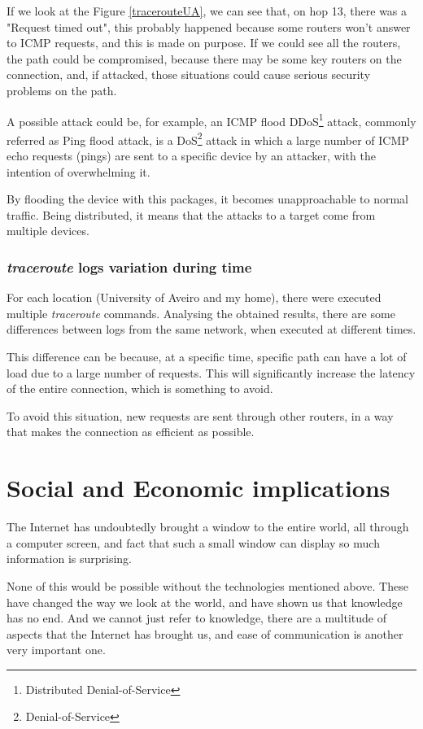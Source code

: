 \documentclass{article}
\newcommand\tab[1][1cm]{\hspace*{#1}}
\begin{document}
\tab If we look at the Figure \underline{\ref{tracerouteUA}}, we can see that, on hop 13, there was a "Request timed out", this probably happened because some routers won't answer to ICMP requests, and this is made on purpose. If we could see all the routers, the path could be compromised, because there may be some key routers on the connection, and, if attacked, those situations could cause serious security problems on the path.

A possible attack could be, for example, an ICMP flood DDoS\footnote{Distributed Denial-of-Service} attack, commonly referred as Ping flood attack, is a DoS\footnote{Denial-of-Service} attack in which a large number of ICMP echo requests (pings) are sent to a specific device by an attacker, with the intention of overwhelming it. 

By flooding the device with this packages, it becomes unapproachable to normal traffic. Being distributed, it means that the attacks to a target come from multiple devices.

\subsubsection{\textit{traceroute} logs variation during time}

\tab For each location (University of Aveiro and my home), there were executed multiple \textit{traceroute} commands. Analysing the obtained results, there are some differences between logs from the same network, when executed at different times. 

This difference can be because, at a specific time, specific path can have a lot of load due to a large number of requests. This will significantly increase the latency of the entire connection, which is something to avoid.

To avoid this situation, new requests are sent through other routers, in a way that makes the connection as efficient as possible.

\newpage

\section{Social and Economic implications}

\tab The Internet has undoubtedly brought a window to the entire world, all through a computer screen, and fact that such a small window can display so much information is surprising.

None of this would be possible without the technologies mentioned above. These have changed the way we look at the world, and have shown us that knowledge has no end. And we cannot just refer to knowledge, there are a multitude of aspects that the Internet has brought us, and ease of communication is another very important one.
\end{document}
